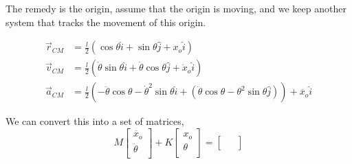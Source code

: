\documentclass{report}
\begin{document}
The remedy is the origin, assume that the origin is moving, and we keep another system that tracks the movement of this origin.

\begin{align*}
	\vec{r}_{CM} &= \frac{l}{2}(\cos{\theta}\hat{i} + \sin{\theta}\hat{j} + x_o \hat{i}) \\
	\vec{v}_{CM} &= \frac{l}{2}(\dot{\theta}\sin{\theta}\hat{i} + \dot{\theta} \cos{\theta} \hat{j} + \dot{x}_{o} \hat{i}) \\
	\vec{a}_{CM} &= \frac{l}{2} (-\ddot{\theta} \cos{\theta} - \dot{\theta}^2 \sin{\theta} \hat{i}  + (\ddot{\theta} \cos{\theta} - \theta^2 \sin{\theta} \hat{j})) + \ddot{x_o} \hat{i}
\end{align*}

We can convert this into a set of matrices,
\[
	M \begin{bmatrix}
		\ddot{x_o} \\
		\ddot{\theta} \\
	\end{bmatrix}
	+ 
	K \begin{bmatrix}
		x_o \\
		\theta \\
	\end{bmatrix}
	= 
	\begin{bmatrix}
	&	\\
	&	\\
	\end{bmatrix}
\]
\end{document}
